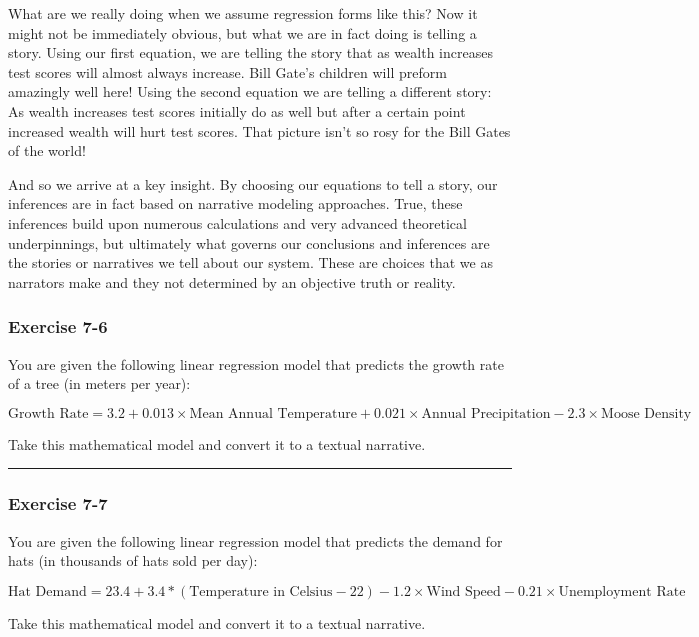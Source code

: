 \documentclass[]{memoir}
\begin{document}
What are we really doing when we assume regression forms like this? Now
it might not be immediately obvious, but what we are in fact doing is
telling a story. Using our first equation, we are telling the story that
as wealth increases test scores will almost always increase. Bill Gate's
children will preform amazingly well here! Using the second equation we
are telling a different story: As wealth increases test scores initially
do as well but after a certain point increased wealth will hurt test
scores. That picture isn't so rosy for the Bill Gates of the world!

And so we arrive at a key insight. By choosing our equations to tell a
story, our inferences are in fact based on narrative modeling
approaches. True, these inferences build upon numerous calculations and
very advanced theoretical underpinnings, but ultimately what governs our
conclusions and inferences are the stories or narratives we tell about
our system. These are choices that we as narrators make and they not
determined by an objective truth or reality.

\subsubsection{Exercise 7-6}

You are given the following linear regression model that predicts the
growth rate of a tree (in meters per year):

\[\text{Growth Rate} = 3.2 + 0.013 \times \text{Mean Annual Temperature} + 0.021 \times \text{Annual Precipitation} - 2.3 \times \text{Moose Density}\]

Take this mathematical model and convert it to a textual narrative.

\begin{center}\rule{3in}{0.4pt}\end{center}

\subsubsection{Exercise 7-7}

You are given the following linear regression model that predicts the
demand for hats (in thousands of hats sold per day):

\[\text{Hat Demand} = 23.4 + 3.4 * (\text{Temperature in Celsius} - 22)- 1.2 \times \text{Wind Speed} - 0.21 \times \text{Unemployment Rate}\]

Take this mathematical model and convert it to a textual narrative.
\end{document}
